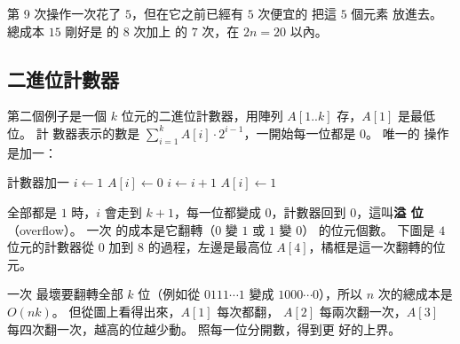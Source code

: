 第 9 次操作一次花了 $5$，但在它之前已經有 $5$ 次便宜的  把這 $5$ 個元素
放進去。 總成本 $15$ 剛好是  的 $8$ 次加上  的 $7$ 次，在
$2n = 20$ 以內。

\subsection{二進位計數器}
\label{sec:amo-counter}

第二個例子是一個 $k$ 位元的二進位計數器，用陣列 $A[1..k]$ 存，$A[1]$ 是最低位。 計
數器表示的數是 $\sum_{i=1}^{k} A[i] \cdot 2^{i-1}$，一開始每一位都是 $0$。 唯一的
操作是加一：

\begin{pseudo}[label=alg:increment]{計數器加一}
    \State $i \gets 1$
        \State $A[i] \gets 0$ 
        \State $i \gets i + 1$
    \EndWhile
        \State $A[i] \gets 1$ 
    \EndIf
\EndProcedure
\end{pseudo}

全部都是 $1$ 時，$i$ 會走到 $k + 1$，每一位都變成 $0$，計數器回到 $0$，這叫\textbf{溢
位}（overflow）。 一次  的成本是它翻轉（$0$ 變 $1$ 或 $1$ 變 $0$）
的位元個數。 下圖是 $4$ 位元的計數器從 $0$ 加到 $8$ 的過程，左邊是最高位
$A[4]$，橘框是這一次翻轉的位元。

\begin{center}
\label{fig:amo-counter}
\end{center}

一次  最壞要翻轉全部 $k$ 位（例如從 $0111\cdots1$ 變成
$1000\cdots0$），所以 $n$ 次的總成本是 $O(nk)$。 但從圖上看得出來，$A[1]$ 每次都翻，
$A[2]$ 每兩次翻一次，$A[3]$ 每四次翻一次，越高的位越少動。 照每一位分開數，得到更
好的上界。

